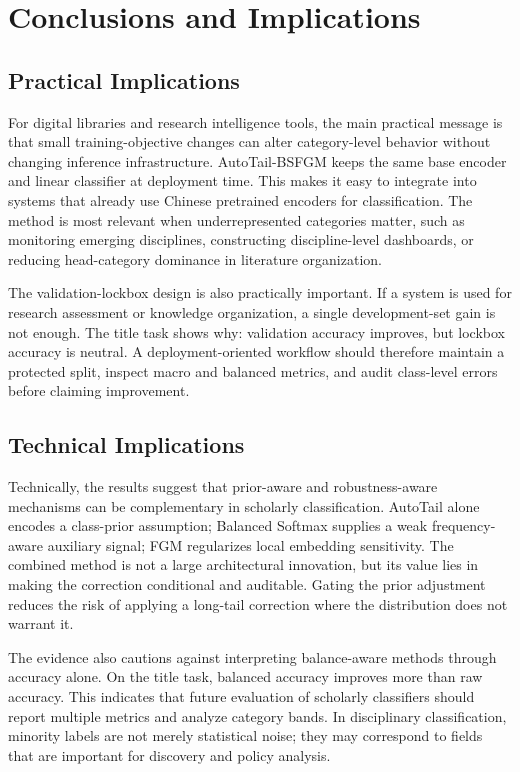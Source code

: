 \documentclass[10pt]{article}
\begin{document}
\section{Conclusions and Implications}

\subsection{Practical Implications}

For digital libraries and research intelligence tools, the main practical message is that small training-objective changes can alter category-level behavior without changing inference infrastructure. AutoTail-BSFGM keeps the same base encoder and linear classifier at deployment time. This makes it easy to integrate into systems that already use Chinese pretrained encoders for classification. The method is most relevant when underrepresented categories matter, such as monitoring emerging disciplines, constructing discipline-level dashboards, or reducing head-category dominance in literature organization.

The validation-lockbox design is also practically important. If a system is used for research assessment or knowledge organization, a single development-set gain is not enough. The title task shows why: validation accuracy improves, but lockbox accuracy is neutral. A deployment-oriented workflow should therefore maintain a protected split, inspect macro and balanced metrics, and audit class-level errors before claiming improvement.

\subsection{Technical Implications}

Technically, the results suggest that prior-aware and robustness-aware mechanisms can be complementary in scholarly classification. AutoTail alone encodes a class-prior assumption; Balanced Softmax supplies a weak frequency-aware auxiliary signal; FGM regularizes local embedding sensitivity. The combined method is not a large architectural innovation, but its value lies in making the correction conditional and auditable. Gating the prior adjustment reduces the risk of applying a long-tail correction where the distribution does not warrant it.

The evidence also cautions against interpreting balance-aware methods through accuracy alone. On the title task, balanced accuracy improves more than raw accuracy. This indicates that future evaluation of scholarly classifiers should report multiple metrics and analyze category bands. In disciplinary classification, minority labels are not merely statistical noise; they may correspond to fields that are important for discovery and policy analysis.
\end{document}
